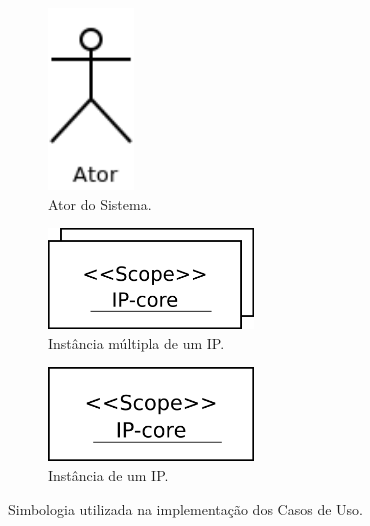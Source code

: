 \documentclass{article}
\begin{document}
  \FloatBarrier
  \begin{figure}[H]
    \centering
    \begin{subfigure}[b]{0.3\textwidth}
      \centering
      \includegraphics[width=0.25\textwidth]{actor_exemple.png}
      \caption{Ator do Sistema.}
      \label{fig:actor_exemple}
    \end{subfigure} 
    \begin{subfigure}[b]{0.3\textwidth}
      \centering
      \includegraphics[width=0.6\textwidth]{ipcore_exemple.png}
      \caption{Instância múltipla de um IP.}
      \label{fig:ipcore_exemple}
    \end{subfigure}
    \begin{subfigure}[b]{0.3\textwidth}
      \centering
      \includegraphics[width=0.6\textwidth]{ipcore_single_exemple.png}
      \caption{Instância de um IP.}
      \label{fig:ipcore_single_exemple}
    \end{subfigure}
    \caption{Simbologia utilizada na implementação dos Casos de Uso.}
    \label{fig:actors}
  \end{figure}
  
\end{document}
